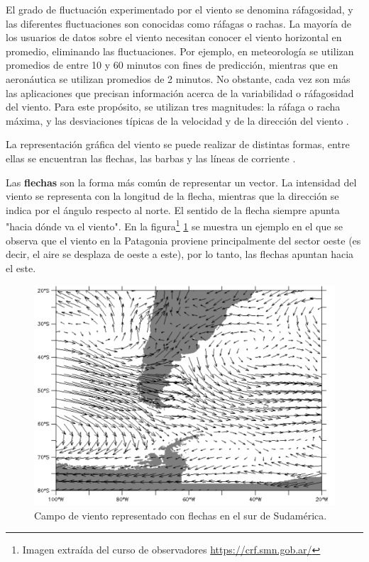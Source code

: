 El grado de fluctuación experimentado por el viento se denomina  ráfagosidad, y las diferentes fluctuaciones son conocidas como ráfagas o rachas. La mayoría de los usuarios de datos sobre el viento necesitan conocer el viento horizontal en promedio, eliminando las fluctuaciones. Por ejemplo, en meteorología se utilizan promedios de entre 10 y 60 minutos con fines de predicción, mientras que en aeronáutica se utilizan promedios de 2 minutos. No obstante, cada vez son más las aplicaciones que precisan información acerca de la variabilidad o ráfagosidad del viento. Para este propósito, se utilizan tres magnitudes: la ráfaga o racha máxima, y las desviaciones típicas de la velocidad y de la dirección del viento \cite{wmoChapter8}.

La representación gráfica del viento se puede realizar de distintas formas, entre ellas se encuentran las flechas, las barbas y las líneas de corriente \cite{CursoDeObsevadores}.

Las \textbf{flechas} son la forma más común de representar un vector. La intensidad del viento se representa con la longitud de la flecha, mientras que la dirección se indica por el ángulo respecto al norte. El sentido de la flecha siempre apunta "hacia dónde va el viento". En la figura\footnote{Imagen extraída del curso de observadores \url{https://crf.smn.gob.ar/}} \ref{fig:mapaFlechas} se muestra un ejemplo en el que se observa que el viento en la Patagonia proviene principalmente del sector oeste (es decir, el aire se desplaza de oeste a este), por lo tanto, las flechas apuntan hacia el este.

\begin{figure}[H]
    \centering
    \includegraphics[width=0.85\linewidth]{Figuras/viento/mapaFlechas.png}
    \caption{Campo de viento representado con flechas en el sur de Sudamérica.}
    \label{fig:mapaFlechas}
\end{figure}

